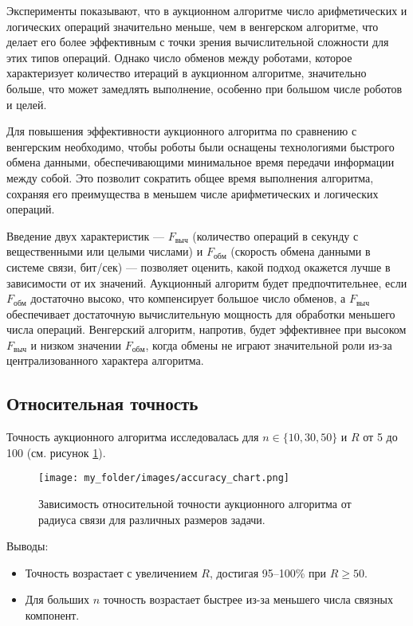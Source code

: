 Эксперименты показывают, что в аукционном алгоритме число арифметических и логических операций значительно меньше, чем в венгерском алгоритме, что делает его более эффективным с точки зрения вычислительной сложности для этих типов операций. Однако число обменов между роботами, которое характеризует количество итераций в аукционном алгоритме, значительно больше, что может замедлять выполнение, особенно при большом числе роботов и целей.

Для повышения эффективности аукционного алгоритма по сравнению с венгерским необходимо, чтобы роботы были оснащены технологиями быстрого обмена данными, обеспечивающими минимальное время передачи информации между собой. Это позволит сократить общее время выполнения алгоритма, сохраняя его преимущества в меньшем числе арифметических и логических операций.

Введение двух характеристик — \( F_{\text{выч}} \) (количество операций в секунду с вещественными или целыми числами) и \( F_{\text{обм}} \) (скорость обмена данными в системе связи, бит/сек) — позволяет оценить, какой подход окажется лучше в зависимости от их значений. Аукционный алгоритм будет предпочтительнее, если \( F_{\text{обм}} \) достаточно высоко, что компенсирует большое число обменов, а \( F_{\text{выч}} \) обеспечивает достаточную вычислительную мощность для обработки меньшего числа операций. Венгерский алгоритм, напротив, будет эффективнее при высоком \( F_{\text{выч}} \) и низком значении \( F_{\text{обм}} \), когда обмены не играют значительной роли из-за централизованного характера алгоритма.



\subsection{Относительная точность}
Точность аукционного алгоритма исследовалась для \( n \in \{10, 30, 50\} \) и \( R \) от 5 до 100 (см. рисунок \ref{fig:accuracy_chart}).

\begin{figure}[h]
    \centering
    \texttt{[image: my\_folder/images/accuracy\_chart.png]}
    \caption{Зависимость относительной точности аукционного алгоритма от радиуса связи для различных размеров задачи.}
    \label{fig:accuracy_chart}
\end{figure}

Выводы:
\begin{itemize}
    \item Точность возрастает с увеличением \( R \), достигая 95--100\% при \( R \geq 50 \).
    \item Для больших \( n \) точность возрастает быстрее из-за меньшего числа связных компонент.
\end{itemize}


